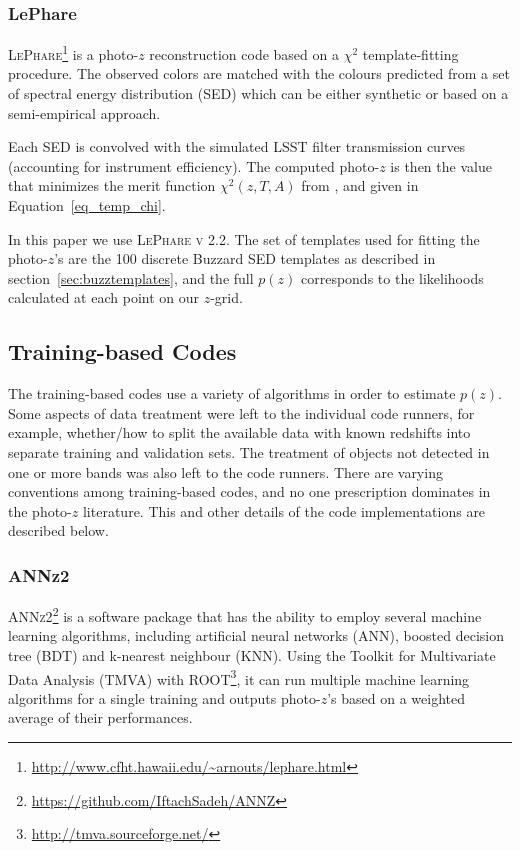 \subsubsection{LePhare}\label{sec:lephare}

\textsc{LePhare}\footnote{\url{http://www.cfht.hawaii.edu/~arnouts/lephare.html}}\citep[Photometric Analysis for Redshift Estimate,][]{Arnouts:99,Ilbert:06} is a photo-$z$ reconstruction code based on a $\chi^2$ template-fitting procedure. The observed colors are matched with the colours predicted from a set of spectral energy distribution (SED) which can be either synthetic or based on a semi-empirical approach. %

Each SED is convolved with the simulated LSST filter transmission curves (accounting for instrument efficiency).  The computed photo-$z$ is then the value that minimizes the merit function $\chi^2 (z,T,A)$ from \citet[]{Arnouts:99}, and given in Equation~\ref{eq_temp_chi}.

In this paper we use \textsc{LePhare v 2.2}.
The set of templates used for fitting the photo-$z$'s are the 100 discrete Buzzard SED templates as described in section~\ref{sec:buzztemplates}, and the full $p(z)$ corresponds to the likelihoods calculated at each point on our $z$-grid.


\subsection{Training-based Codes}
\label{sec:trainingcodes}
The training-based codes use a variety of algorithms in order to estimate $p(z)$. 
Some aspects of data treatment were left to the individual code runners, for example, whether/how to split the available data with known redshifts into separate training and validation sets.  The treatment of objects not detected in one or more bands was also left to the code runners.  There are varying conventions among training-based codes, and no one prescription dominates in the photo-$z$ literature.  This and other details of the code implementations are described below.  

\subsubsection{ANNz2}
\label{sec:annz2}

\textsc{ANNz2}\footnote{\url{https://github.com/IftachSadeh/ANNZ}} \citep{Sadeh:16} is a software package that has the ability to employ several machine learning algorithms, including artificial neural networks (ANN), boosted decision tree (BDT) and k-nearest neighbour (KNN). Using the Toolkit for Multivariate Data Analysis (TMVA) with ROOT\footnote{\url{http://tmva.sourceforge.net/}}, it can run multiple machine learning algorithms for a single training and outputs photo-$z$'s based on a weighted average of their performances.

